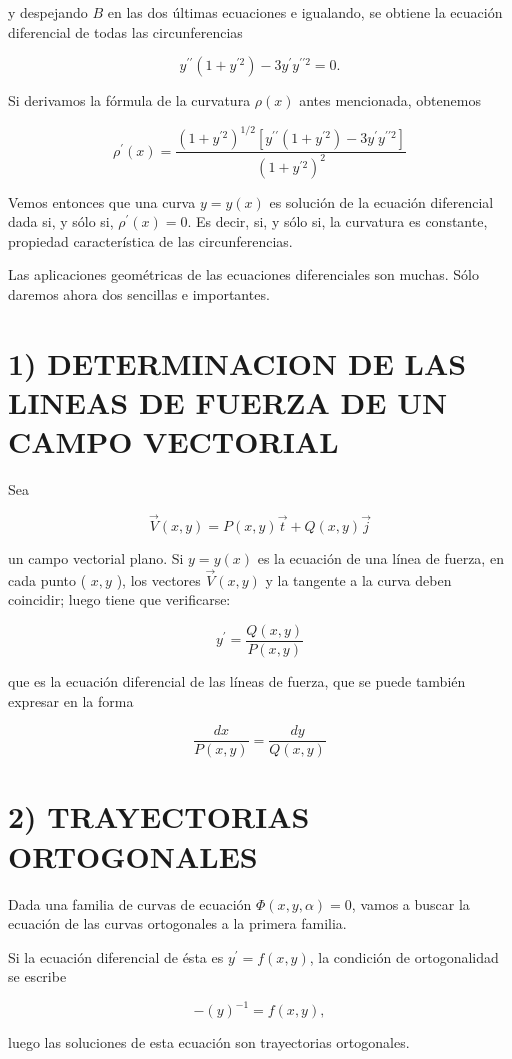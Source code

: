 \documentclass[10pt]{article}
\theoremstyle{plain}
\theoremstyle{definition}
\theoremstyle{remark}
\begin{document}
y despejando $B$ en las dos últimas ecuaciones e igualando, se obtiene la ecuación diferencial de todas las circunferencias

$$
y^{\prime \prime}\left(1+y^{\prime 2}\right)-3 y^{\prime} y^{\prime \prime 2}=0 .
$$

Si derivamos la fórmula de la curvatura $\rho(x)$ antes mencionada, obtenemos

$$
\rho^{\prime}(x)=\frac{\left(1+y^{\prime 2}\right)^{1 / 2}\left[y^{\prime \prime}\left(1+y^{\prime 2}\right)-3 y^{\prime} y^{\prime \prime 2}\right]}{\left(1+y^{\prime 2}\right)^{2}}
$$

Vemos entonces que una curva $y=y(x)$ es solución de la ecuación diferencial dada si, y sólo si, $\rho^{\prime}(x)=0$. Es decir, si, y sólo si, la curvatura es constante, propiedad característica de las circunferencias.

Las aplicaciones geométricas de las ecuaciones diferenciales son muchas. Sólo daremos ahora dos sencillas e importantes.

\section*{1) DETERMINACION DE LAS LINEAS DE FUERZA DE UN CAMPO VECTORIAL}
Sea

$$
\vec{V}(x, y)=P(x, y) \vec{t}+Q(x, y) \vec{j}
$$

un campo vectorial plano. Si $y=y(x)$ es la ecuación de una línea de fuerza, en cada punto ( $x, y$ ), los vectores $\vec{V}(x, y)$ y la tangente a la curva deben coincidir; luego tiene que verificarse:

$$
y^{\prime}=\frac{Q(x, y)}{P(x, y)}
$$

que es la ecuación diferencial de las líneas de fuerza, que se puede también expresar en la forma

$$
\frac{d x}{P(x, y)}=\frac{d y}{Q(x, y)}
$$


\section*{2) TRAYECTORIAS ORTOGONALES}
Dada una familia de curvas de ecuación $\Phi(x, y, \alpha)=0$, vamos a buscar la ecuación de las curvas ortogonales a la primera familia.

Si la ecuación diferencial de ésta es $y^{\prime}=f(x, y)$, la condición de ortogonalidad se escribe

$$
-(y)^{-1}=f(x, y),
$$

luego las soluciones de esta ecuación son trayectorias ortogonales.
\end{document}
